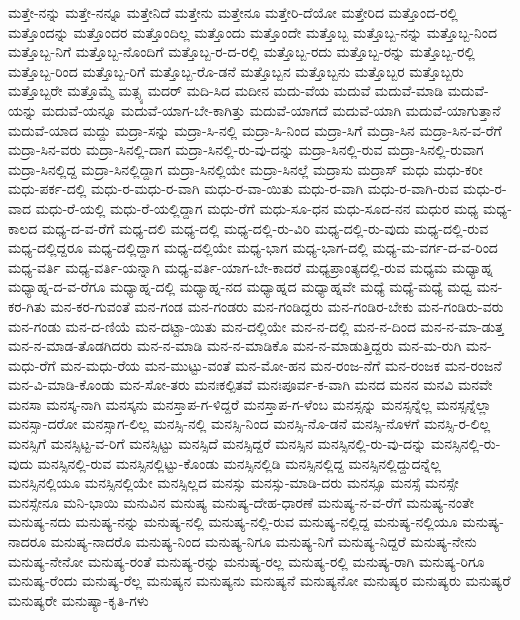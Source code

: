 {ಮತ್ತೇ-ನನ್ನು
ಮತ್ತೇ-ನನ್ನೂ
ಮತ್ತೇನಿದೆ
ಮತ್ತೇನು
ಮತ್ತೇನೂ
ಮತ್ತೇರಿ-ದೆಯೋ
ಮತ್ತೇರಿದ
ಮತ್ತೊಂದ-ರಲ್ಲಿ
ಮತ್ತೊಂದನ್ನು
ಮತ್ತೊಂದರ
ಮತ್ತೊಂದಿಲ್ಲ
ಮತ್ತೊಂದು
ಮತ್ತೊಂದೇ
ಮತ್ತೊಬ್ಬ
ಮತ್ತೊಬ್ಬ-ನನ್ನು
ಮತ್ತೊಬ್ಬ-ನಿಂದ
ಮತ್ತೊಬ್ಬ-ನಿಗೆ
ಮತ್ತೊಬ್ಬ-ನೊಂದಿಗೆ
ಮತ್ತೊಬ್ಬ-ರ-ದ-ರಲ್ಲಿ
ಮತ್ತೊಬ್ಬ-ರದು
ಮತ್ತೊಬ್ಬ-ರನ್ನು
ಮತ್ತೊಬ್ಬ-ರಲ್ಲಿ
ಮತ್ತೊಬ್ಬ-ರಿಂದ
ಮತ್ತೊಬ್ಬ-ರಿಗೆ
ಮತ್ತೊಬ್ಬ-ರೊ-ಡನೆ
ಮತ್ತೊಬ್ಬನ
ಮತ್ತೊಬ್ಬನು
ಮತ್ತೊಬ್ಬರ
ಮತ್ತೊಬ್ಬರು
ಮತ್ತೊಬ್ಬರೇ
ಮತ್ತೊಮ್ಮೆ
ಮತ್ಸ್ಯ
ಮದರ್
ಮದಿ-ಸಿದ
ಮದೀನ
ಮದು-ವೆಯ
ಮದುವೆ
ಮದುವೆ-ಮಾಡಿ
ಮದುವೆ-ಯನ್ನು
ಮದುವೆ-ಯನ್ನೂ
ಮದುವೆ-ಯಾಗ-ಬೇ-ಕಾಗಿತ್ತು
ಮದುವೆ-ಯಾಗದೆ
ಮದುವೆ-ಯಾಗಿ
ಮದುವೆ-ಯಾಗುತ್ತಾನೆ
ಮದುವೆ-ಯಾದ
ಮದ್ದು
ಮದ್ರಾ-ಸನ್ನು
ಮದ್ರಾ-ಸಿ-ನಲ್ಲಿ
ಮದ್ರಾ-ಸಿ-ನಿಂದ
ಮದ್ರಾ-ಸಿಗೆ
ಮದ್ರಾ-ಸಿನ
ಮದ್ರಾ-ಸಿನ-ವ-ರೆಗೆ
ಮದ್ರಾ-ಸಿನ-ವರು
ಮದ್ರಾ-ಸಿನಲ್ಲಿ-ದಾಗ
ಮದ್ರಾ-ಸಿನಲ್ಲಿ-ರು-ವು-ದನ್ನು
ಮದ್ರಾ-ಸಿನಲ್ಲಿ-ರುವ
ಮದ್ರಾ-ಸಿನಲ್ಲಿ-ರುವಾಗ
ಮದ್ರಾ-ಸಿನಲ್ಲಿದ್ದ
ಮದ್ರಾ-ಸಿನಲ್ಲಿದ್ದಾಗ
ಮದ್ರಾ-ಸಿನಲ್ಲಿಯೇ
ಮದ್ರಾ-ಸಿನಲ್ಲೆ
ಮದ್ರಾಸು
ಮದ್ರಾಸ್
ಮಧು
ಮಧು-ಕರೀ
ಮಧು-ಪರ್ಕ-ದಲ್ಲಿ
ಮಧು-ರ-ಮಧು-ರ-ವಾಗಿ
ಮಧು-ರ-ವಾ-ಯಿತು
ಮಧು-ರ-ವಾಗಿ
ಮಧು-ರ-ವಾಗಿ-ರುವ
ಮಧು-ರ-ವಾದ
ಮಧು-ರೆ-ಯಲ್ಲಿ
ಮಧು-ರೆ-ಯಲ್ಲಿದ್ದಾಗ
ಮಧು-ರೆಗೆ
ಮಧು-ಸೂ-ಧನ
ಮಧು-ಸೂದ-ನನ
ಮಧುರ
ಮಧ್ಯ
ಮಧ್ಯ-ಕಾಲದ
ಮಧ್ಯ-ದ-ವ-ರೆಗೆ
ಮಧ್ಯ-ದಲಿ
ಮಧ್ಯ-ದಲ್ಲಿ
ಮಧ್ಯ-ದಲ್ಲಿ-ರು-ವಿರಿ
ಮಧ್ಯ-ದಲ್ಲಿ-ರು-ವುದು
ಮಧ್ಯ-ದಲ್ಲಿ-ರುವ
ಮಧ್ಯ-ದಲ್ಲಿದ್ದರೂ
ಮಧ್ಯ-ದಲ್ಲಿದ್ದಾಗ
ಮಧ್ಯ-ದಲ್ಲಿಯೇ
ಮಧ್ಯ-ಭಾಗ
ಮಧ್ಯ-ಭಾಗ-ದಲ್ಲಿ
ಮಧ್ಯ-ಮ-ವರ್ಗ-ದ-ವ-ರಿಂದ
ಮಧ್ಯ-ವರ್ತಿ
ಮಧ್ಯ-ವರ್ತಿ-ಯನ್ನಾಗಿ
ಮಧ್ಯ-ವರ್ತಿ-ಯಾಗ-ಬೇ-ಕಾದರೆ
ಮಧ್ಯಪ್ರಾಂತ್ಯದಲ್ಲಿ-ರುವ
ಮಧ್ಯಮ
ಮಧ್ಯಾಹ್ನ
ಮಧ್ಯಾಹ್ನ-ದ-ವ-ರೆಗೂ
ಮಧ್ಯಾಹ್ನ-ದಲ್ಲಿ
ಮಧ್ಯಾಹ್ನ-ನದ
ಮಧ್ಯಾಹ್ನದ
ಮಧ್ಯಾಹ್ನವೇ
ಮಧ್ಯೆ
ಮಧ್ಯೆ-ಮಧ್ಯೆ
ಮಧ್ವ
ಮನ-ಕರ-ಗಿತು
ಮನ-ಕರ-ಗುವಂತೆ
ಮನ-ಗಂಡ
ಮನ-ಗಂಡರು
ಮನ-ಗಂಡಿದ್ದರು
ಮನ-ಗಂಡಿರ-ಬೇಕು
ಮನ-ಗಂಡಿರು-ವರು
ಮನ-ಗಂಡು
ಮನ-ದ-ಣಿಯೆ
ಮನ-ದಟ್ಟಾ-ಯಿತು
ಮನ-ದಲ್ಲಿಯೇ
ಮನ-ನ-ದಲ್ಲಿ
ಮನ-ನ-ದಿಂದ
ಮನ-ನ-ಮಾ-ಡುತ್ತ
ಮನ-ನ-ಮಾಡ-ತೊಡಗಿದರು
ಮನ-ನ-ಮಾಡಿ
ಮನ-ನ-ಮಾಡಿಕೊ
ಮನ-ನ-ಮಾಡುತ್ತಿದ್ದರು
ಮನ-ಮ-ರುಗಿ
ಮನ-ಮಧು-ರೆಗೆ
ಮನ-ಮಧು-ರೆಯ
ಮನ-ಮುಟ್ಟು-ವಂತೆ
ಮನ-ಮೋ-ಹನ
ಮನ-ರಂಜ-ನೆಗೆ
ಮನ-ರಂಜಕ
ಮನ-ರಂಜನೆ
ಮನ-ವಿ-ಮಾಡಿ-ಕೊಂಡು
ಮನ-ಸೋ-ತರು
ಮನಃಕಲ್ಪಿತವೆ
ಮನಃಪೂರ್ವ-ಕ-ವಾಗಿ
ಮನದ
ಮನನ
ಮನವಿ
ಮನವೇ
ಮನಸಾ
ಮನಸ್ಕ-ನಾಗಿ
ಮನಸ್ಕನು
ಮನಸ್ತಾಪ-ಗ-ಳಿದ್ದರೆ
ಮನಸ್ತಾಪ-ಗ-ಳೆಂಬ
ಮನಸ್ಸನ್ನು
ಮನಸ್ಸನ್ನೆಲ್ಲ
ಮನಸ್ಸನ್ನೆಲ್ಲಾ
ಮನಸ್ಸಾ-ದರೋ
ಮನಸ್ಸಾಗ-ಲಿಲ್ಲ
ಮನಸ್ಸಿ-ನಲ್ಲಿ
ಮನಸ್ಸಿ-ನಿಂದ
ಮನಸ್ಸಿ-ನೊ-ಡನೆ
ಮನಸ್ಸಿ-ನೊಳಗೆ
ಮನಸ್ಸಿ-ರ-ಲಿಲ್ಲ
ಮನಸ್ಸಿಗೆ
ಮನಸ್ಸಿಟ್ಟ-ವ-ರಿಗೆ
ಮನಸ್ಸಿಟ್ಟು
ಮನಸ್ಸಿದೆ
ಮನಸ್ಸಿದ್ದರೆ
ಮನಸ್ಸಿನ
ಮನಸ್ಸಿನಲ್ಲಿ-ರು-ವು-ದನ್ನು
ಮನಸ್ಸಿನಲ್ಲಿ-ರು-ವುದು
ಮನಸ್ಸಿನಲ್ಲಿ-ರುವ
ಮನಸ್ಸಿನಲ್ಲಿಟ್ಟು-ಕೊಂಡು
ಮನಸ್ಸಿನಲ್ಲಿಡಿ
ಮನಸ್ಸಿನಲ್ಲಿದ್ದ
ಮನಸ್ಸಿನಲ್ಲಿದ್ದುದನ್ನೆಲ್ಲ
ಮನಸ್ಸಿನಲ್ಲಿಯೂ
ಮನಸ್ಸಿನಲ್ಲಿಯೇ
ಮನಸ್ಸಿಲ್ಲದ
ಮನಸ್ಸು
ಮನಸ್ಸು-ಮಾಡಿ-ದರು
ಮನಸ್ಸೂ
ಮನಸ್ಸೆ
ಮನಸ್ಸೇ
ಮನಸ್ಸೇನೂ
ಮನಿ-ಭಾಯಿ
ಮನುವಿನ
ಮನುಷ್ಯ
ಮನುಷ್ಯ-ದೇಹ-ಧಾರಣೆ
ಮನುಷ್ಯ-ನ-ವ-ರೆಗೆ
ಮನುಷ್ಯ-ನಂತೇ
ಮನುಷ್ಯ-ನದು
ಮನುಷ್ಯ-ನನ್ನು
ಮನುಷ್ಯ-ನಲ್ಲಿ
ಮನುಷ್ಯ-ನಲ್ಲಿ-ರುವ
ಮನುಷ್ಯ-ನಲ್ಲಿದ್ದ
ಮನುಷ್ಯ-ನಲ್ಲಿಯೂ
ಮನುಷ್ಯ-ನಾದರೂ
ಮನುಷ್ಯ-ನಾದರೊ
ಮನುಷ್ಯ-ನಿಂದ
ಮನುಷ್ಯ-ನಿಗೂ
ಮನುಷ್ಯ-ನಿಗೆ
ಮನುಷ್ಯ-ನಿದ್ದರೆ
ಮನುಷ್ಯ-ನೇನು
ಮನುಷ್ಯ-ನೇನೋ
ಮನುಷ್ಯ-ರಂತೆ
ಮನುಷ್ಯ-ರನ್ನು
ಮನುಷ್ಯ-ರಲ್ಲ
ಮನುಷ್ಯ-ರಲ್ಲಿ
ಮನುಷ್ಯ-ರಾಗಿ
ಮನುಷ್ಯ-ರಿಗೂ
ಮನುಷ್ಯ-ರೆಂದು
ಮನುಷ್ಯ-ರೆಲ್ಲ
ಮನುಷ್ಯನ
ಮನುಷ್ಯನು
ಮನುಷ್ಯನೆ
ಮನುಷ್ಯನೋ
ಮನುಷ್ಯರ
ಮನುಷ್ಯರು
ಮನುಷ್ಯರೆ
ಮನುಷ್ಯರೇ
ಮನುಷ್ಯಾ-ಕೃತಿ-ಗಳು
}
